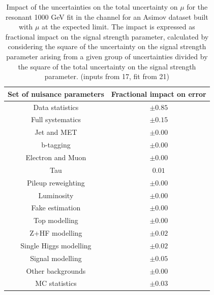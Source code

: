 \begin{table}
\centering
\begin{tabular}{|c|c|}
\hline
Set of nuisance parameters & Fractional impact on error\\
\hline
Data statistics & $\pm 0.85$\\
Full systematics & $\pm 0.15$\\
Jet and MET & $\pm 0.00$ \\
b-tagging & $\pm 0.00$\\
Electron and Muon & $\pm 0.00$\\
Tau & $0.01$\\
Pileup reweighting & $\pm 0.00$\\
Luminosity & $\pm 0.00$\\
Fake estimation & $\pm 0.00$\\
Top modelling & $\pm 0.00$\\ 
Z+HF modelling & $\pm 0.02$\\
Single Higgs modelling & $\pm 0.02$\\
Signal modelling & $\pm 0.05$\\
Other backgrounds & $\pm 0.00$\\
MC statistics & $\pm 0.03$\\
\hline
\end{tabular}
\caption{Impact of the uncertainties on the total uncertainty on $\mu$ for the resonant 1000 GeV fit in the \hadhad channel for an Asimov dataset built with $\mu$ at the expected limit. The impact is expressed as fractional impact on the signal strength parameter,  calculated by considering the square of the uncertainty on the signal strength parameter arising from a given group of uncertainties divided by the square of the total uncertainty on the signal strength parameter.  (inputs from 17, fit from 21)}
\label{sec:fit:tab:HadHadBreakdown2HDM1000Asimov}
\end{table}



